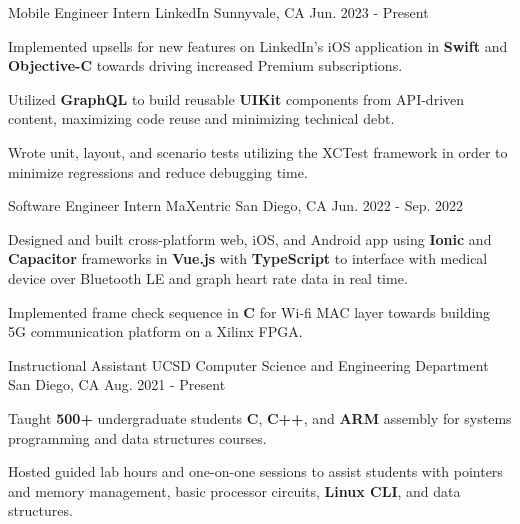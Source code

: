

\begin{cventries}

\cventry
  {Mobile Engineer Intern} %
  {LinkedIn} %
  {Sunnyvale, CA} %
  {Jun. 2023 - Present} %
  {
    \begin{cvitems} %
      \item {Implemented upsells for new features on LinkedIn’s iOS application in \textbf{Swift} and \textbf{Objective-C} towards driving increased Premium subscriptions. }
      \item {Utilized \textbf{GraphQL} to build reusable \textbf{UIKit} components from API-driven content, maximizing code reuse and minimizing technical debt.}
      \item {Wrote unit, layout, and scenario tests utilizing the XCTest framework in order to minimize regressions and reduce debugging time.}
    \end{cvitems}
  }


\cventry
  {Software Engineer Intern} %
  {MaXentric} %
  {San Diego, CA} %
  {Jun. 2022 - Sep. 2022} %
  {
    \begin{cvitems} %
      \item {Designed and built cross-platform web, iOS, and Android app using \textbf{Ionic} and \textbf{Capacitor} frameworks in \textbf{Vue.js} with \textbf{TypeScript} to interface with medical device over Bluetooth LE and graph heart rate data in real time.}
      \item {Implemented frame check sequence in \textbf{C} for Wi‐fi MAC layer towards building 5G communication platform on a Xilinx FPGA.}
    \end{cvitems}
  }


\cventry
  {Instructional Assistant} %
  {UCSD Computer Science and Engineering Department} %
  {San Diego, CA} %
  {Aug. 2021 - Present} %
  {
    \begin{cvitems} %
      \item {Taught \textbf{500+} undergraduate students \textbf{C}, \textbf{C++}, and \textbf{ARM} assembly for systems programming and data structures courses.}
      \item {Hosted guided lab hours and one-on-one sessions to assist students with pointers and memory management, basic processor circuits, \textbf{Linux CLI}, and data structures.}
    \end{cvitems}
  }



\end{cventries}
